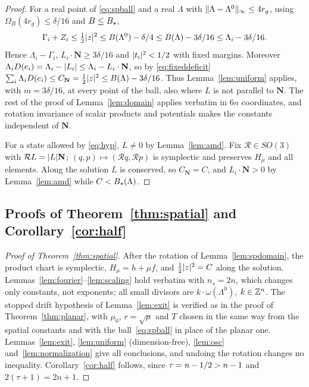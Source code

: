 \begin{proof}
For a real point of \eqref{eq:spball} and a real $\Lambda$ with $\lVert \Lambda-\Lambda^0\rVert_\infty\le4r_g$, using
$\Omega_B(4r_g)\le\delta/16$ and $B\le B_\star$,
\[
  \Gamma_i+Z_i\le\tfrac12\lvert z\rvert^2\le B(\Lambda^0)-\delta/4\le B(\Lambda)-3\delta/16\le\Lambda_i-3\delta/16 .
\]
Hence $\Lambda_i-\Gamma_i$, $L_i\cdot\mathbf N\ge3\delta/16$ and $\lvert t_i\rvert^2<1/2$ with fixed margins. Moreover
$\Lambda_iD(e_i)=\Lambda_i-\lvert L_i\rvert\le\Lambda_i-L_i\cdot\mathbf N$, so by \eqref{eq:fixeddeficit}
$\sum_i\Lambda_iD(e_i)\le C_{\mathbf N}=\frac12\lvert z\rvert^2\le B(\Lambda)-3\delta/16$. Thus Lemma~\ref{lem:uniform}
applies, with $m=3\delta/16$, at every point of the ball, also where $L$ is not parallel to $\mathbf N$. The rest
of the proof of Lemma~\ref{lem:domain} applies verbatim in $6n$ coordinates, and rotation invariance of scalar
products and potentials makes the constants independent of $\mathbf N$.

For a state allowed by \eqref{eq:hyp}, $L\ne0$ by Lemma~\ref{lem:amd}. Fix $\mathcal R\in SO(3)$ with
$\mathcal RL=\lvert L\rvert\mathbf N$; $(q,p)\mapsto(\mathcal Rq,\mathcal Rp)$ is symplectic and preserves $H_\mu$ and all
elements. Along the solution $L$ is conserved, so
$C_{\mathbf N}=C$, and $L_i\cdot\mathbf N>0$ by Lemma~\ref{lem:amd} while $C<B_\star(\Lambda)$.
\end{proof}

\subsection{Proofs of Theorem~\ref{thm:spatial} and Corollary~\ref{cor:half}}

\begin{proof}[Proof of Theorem~\ref{thm:spatial}]
After the rotation of Lemma~\ref{lem:spdomain}, the product chart is symplectic, $H_\mu=h+\mu f$, and
$\frac12\lvert z\rvert^2=C$ along the solution. Lemmas~\ref{lem:fourier}--\ref{lem:scaling} hold verbatim with $n_s=2n$,
which changes only constants, not exponents; all small divisors are $k\cdot\omega(\Lambda^0)$, $k\in\mathbb{Z}^n$.
The stopped drift hypothesis of Lemma~\ref{lem:exit} is verified as in the proof of Theorem~\ref{thm:planar}, with $\mu_0$, $r=\sqrt\mu$ and $T$ chosen in the same way from the spatial constants and with the ball~\eqref{eq:spball} in place of the planar one. Lemmas~\ref{lem:exit}, \ref{lem:uniform} (dimension-free), \ref{lem:osc} and~\ref{lem:normalization} give all
conclusions, and undoing the rotation changes no inequality. Corollary~\ref{cor:half} follows, since
$\tau=n-1/2>n-1$ and $2(\tau+1)=2n+1$.
\end{proof}
